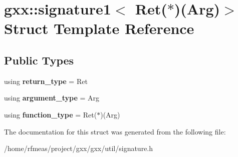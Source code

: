 \hypertarget{structgxx_1_1signature1_3_01Ret_07_5_08_07Arg_08_4}{}\section{gxx\+:\+:signature1$<$ Ret($\ast$)(Arg)$>$ Struct Template Reference}
\label{structgxx_1_1signature1_3_01Ret_07_5_08_07Arg_08_4}
\subsection*{Public Types}
\begin{DoxyCompactItemize}
\item 
using {\bfseries return\+\_\+type} = Ret\hypertarget{structgxx_1_1signature1_3_01Ret_07_5_08_07Arg_08_4_a9ba186d3a34259612ee7b6bf78c3aa7a}{}\label{structgxx_1_1signature1_3_01Ret_07_5_08_07Arg_08_4_a9ba186d3a34259612ee7b6bf78c3aa7a}

\item 
using {\bfseries argument\+\_\+type} = Arg\hypertarget{structgxx_1_1signature1_3_01Ret_07_5_08_07Arg_08_4_a9a6b0efebcb895150101cc2fe47c9686}{}\label{structgxx_1_1signature1_3_01Ret_07_5_08_07Arg_08_4_a9a6b0efebcb895150101cc2fe47c9686}

\item 
using {\bfseries function\+\_\+type} = Ret($\ast$)(Arg)\hypertarget{structgxx_1_1signature1_3_01Ret_07_5_08_07Arg_08_4_a6d4665b1212bd3cf2c453a8842e66157}{}\label{structgxx_1_1signature1_3_01Ret_07_5_08_07Arg_08_4_a6d4665b1212bd3cf2c453a8842e66157}

\end{DoxyCompactItemize}


The documentation for this struct was generated from the following file\+:\begin{DoxyCompactItemize}
\item 
/home/rfmeas/project/gxx/gxx/util/signature.\+h\end{DoxyCompactItemize}
